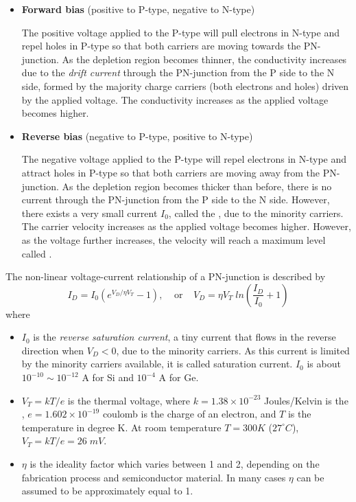 \begin{itemize}
\item {\bf Forward bias} (positive to P-type, negative to N-type)

  The positive voltage applied to the P-type will pull electrons in N-type
  and repel holes in P-type so that both carriers are moving towards the 
  PN-junction. As the depletion region becomes thinner, the conductivity 
  increases due to the {\em drift current} through the PN-junction from 
  the P side to the N side, formed by the majority charge carriers (both 
  electrons and holes) driven by the applied voltage. The conductivity 
  increases as the applied voltage becomes higher. 

\item {\bf Reverse bias} (negative to P-type, positive to N-type)

  The negative voltage applied to the P-type will repel electrons in N-type
  and attract holes in P-type so that both carriers are moving away from 
  the PN-junction. As the depletion region becomes thicker than before, 
  there is no current through the PN-junction from the P side to the N side.
  However, there exists a very small current $I_0$, called the 
  ,
  due to the minority carriers.
  The carrier velocity increases as the applied voltage becomes higher. 
  However, as the voltage further increases, the velocity will reach a 
  maximum level called
  .

  

\end{itemize}
The non-linear voltage-current relationship of a PN-junction is described by
\[
I_D=I_0 \left( e^{V_D/\eta V_T}-1 \right), \;\;\;\;\mbox{or}\;\;\;\;
V_D=\eta V_T\;ln \left(\frac{I_D}{I_0}+1\right)
\]
where 
\begin{itemize}
\item $I_0$ is the {\em reverse saturation current}, a tiny current that 
  flows in the reverse direction when $V_D < 0$, due to the minority 
  carriers. As this current is limited by the minority carriers available,
  it is called saturation current. $I_0$ is about $10^{-10} \sim 10^{-12}$ 
  A for Si and $10^{-4}$ A for Ge.
\item $ V_T=kT/e $ is the thermal voltage, where 
  $k=1.38\times 10^{-23}$ Joules/Kelvin is the
,
  $e=1.602\times 10^{-19}$ coulomb is the charge of an electron, and
  $T$ is the temperature in degree K. At room temperature $T=300 K$
  ($27^\circ C$), $V_T=kT/e=26\; mV$.
\item $\eta$ is the ideality factor which varies between 1 and 2, depending
  on the fabrication process and semiconductor material. In many cases $\eta$
  can be assumed to be approximately equal to 1.
\end{itemize}
